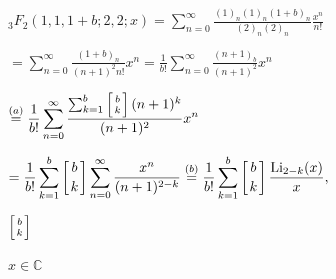 \documentclass{article}
\def\lthtmlcheckvsize{\ifdim\ht\sizebox<\vsize 
  \ifdim\wd\sizebox<\hsize\expandafter\hfill\fi \expandafter\vfill
  \else\expandafter\vss\fi}%
\begin{document}
{\newpage\clearpage
{}%
$\displaystyle _3F_2(1,1,1+b;2,2;x)= \sum^{\infty}_{n=0}\frac{(1)_n(1)_n(1+b)_n}{(2)_n(2)_n} \frac{x^n}{n!} \nonumber$%
\lthtmlindisplaymathZ
\lthtmlcheckvsize\clearpage}

{\newpage\clearpage
{}%
$\displaystyle =\sum^{\infty}_{n=0}\frac{(1+b)_n}{(n+1)^2n!}x^n = \frac{1}{b!}\sum^{\infty}_{n=0} \frac{(n+1)_{b}}{(n+1)^2}x^n \nonumber$%
\lthtmlindisplaymathZ
\lthtmlcheckvsize\clearpage}

{\newpage\clearpage
{}%
$\displaystyle \overset{(a)}{=} \frac{1}{b!} \sum^{\infty}_{n=0} \frac{\sum^{b}_{k=1}\left[ b \atop k \right](n+1)^k}{(n+1)^2} x^n\nonumber$%
\lthtmlindisplaymathZ
\lthtmlcheckvsize\clearpage}

{\newpage\clearpage
{}%
$\displaystyle = \frac{1}{b!} \sum^{b}_{k=1}\left[ b \atop k \right] \sum^{\infty}_{n=0}  \frac{x^n}{(n+1)^{2-k}} \overset{(b)}{=} \frac{1}{b!}\sum^{b}_{k=1} \left[ b \atop k \right]\frac{\text{Li}_{2-k}(x)}{x},$%
\lthtmlindisplaymathZ
\lthtmlcheckvsize\clearpage}

{\newpage\clearpage
{}%
$ \left[ b \atop k \right]$%
\lthtmlindisplaymathZ
\lthtmlcheckvsize\clearpage}

{\newpage\clearpage
{}%
$ x \in \mathbb{C}$%
\lthtmlindisplaymathZ
\lthtmlcheckvsize\clearpage}
\end{document}
